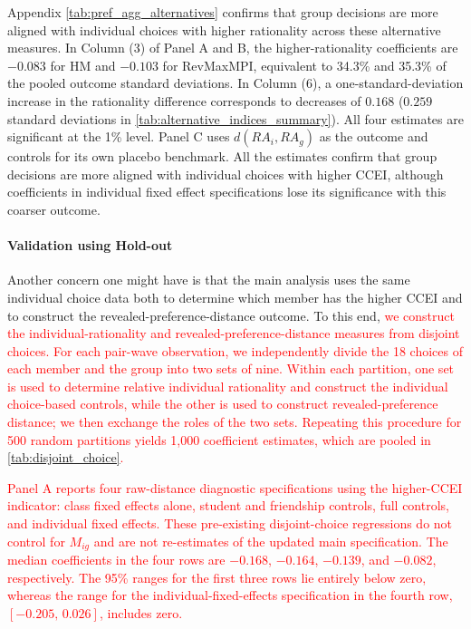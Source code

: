 \documentclass[11 pt]{article}
\begin{document}
Appendix \autoref{tab:pref_agg_alternatives} confirms that group decisions are more aligned with individual choices with higher rationality across these alternative measures. In Column (3) of Panel A and B, the higher-rationality coefficients are $-0.083$ for HM and $-0.103$ for RevMaxMPI, equivalent to 34.3\% and 35.3\% of the pooled outcome standard deviations. In Column (6), a one-standard-deviation increase in the rationality difference corresponds to decreases of $0.168$ ($0.259$ standard deviations in \autoref{tab:alternative_indices_summary}). All four estimates are significant at the 1\% level. Panel C uses $d(RA_i,RA_g)$ as the outcome and controls for its own placebo benchmark. All the estimates confirm that group decisions are more aligned with individual choices with higher CCEI, although coefficients in individual fixed effect specifications lose its significance with this coarser outcome.

\paragraph{Validation using Hold-out} Another concern one might have is that the main analysis uses the same individual choice data both to determine which member has the higher CCEI and to construct the revealed-preference-distance outcome. To this end, \textcolor{red}{we construct the individual-rationality and revealed-preference-distance measures from disjoint choices. For each pair-wave observation, we independently divide the 18 choices of each member and the group into two sets of nine. Within each partition, one set is used to determine relative individual rationality and construct the individual choice-based controls, while the other is used to construct revealed-preference distance; we then exchange the roles of the two sets. Repeating this procedure for 500 random partitions yields 1,000 coefficient estimates, which are pooled in \autoref{tab:disjoint_choice}.}

\textcolor{red}{Panel A reports four raw-distance diagnostic specifications using the higher-CCEI indicator: class fixed effects alone, student and friendship controls, full controls, and individual fixed effects. These pre-existing disjoint-choice regressions do not control for $M_{ig}$ and are not re-estimates of the updated main specification. The median coefficients in the four rows are $-0.168$, $-0.164$, $-0.139$, and $-0.082$, respectively. The 95\% ranges for the first three rows lie entirely below zero, whereas the range for the individual-fixed-effects specification in the fourth row, $[-0.205,\,0.026]$, includes zero.}
\end{document}
